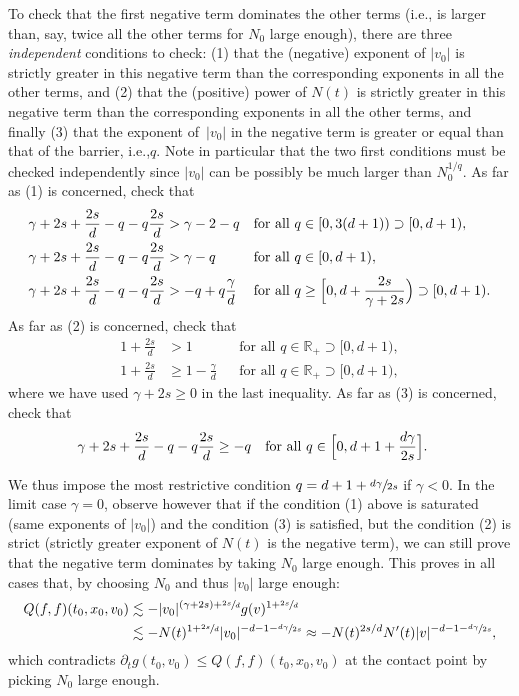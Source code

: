 \documentclass[11pt]{article}
\newcommand{\ie}{i.e.,\xspace}
\theoremstyle{plain}
\theoremstyle{definition}
\numberwithin{equation}{section}
\newcommand{\R}{\mathbb R}
\let\A N
\newcommand{\Ao}{N_0}
\begin{document}
To check that the first negative term dominates the other terms
(\ie is larger than, say, twice all the other terms for $\Ao$ large
enough), there are three \emph{independent} conditions to check: (1)
that the (negative) exponent of $|v_0|$ is strictly greater in this
negative term than the corresponding exponents in all the other terms,
and (2) that the (positive) power of $\A(t)$ is strictly greater in
this negative term than the corresponding exponents in all the other
terms, and finally (3) that the exponent of~$|v_0|$ in the negative
term is greater or equal than that of the barrier, \ie $q$. Note in
particular that the two first conditions must be checked independently since
$|v_0|$ can be possibly be much larger than $\Ao^{1/q}$. As far as (1)
is concerned, check that
\begin{align*}
\gamma + 2s + \frac{2s}{d} -q -q\frac{2s}{d}
& > \gamma - 2 - q
&& \text{for all $q \in [0,3(d+1)) \supset [0,d+1)$}, \\
\gamma + 2s + \frac{2s}{d} -q -q\frac{2s}{d}
& > \gamma - q
&& \text{for all $q \in [0,d+1)$}, \\
\gamma + 2s + \frac{2s}{d} -q -q\frac{2s}{d}
& > - q + q \frac{\gamma}{d}
&& \text{for all $q \ge \Bigl[0,d+\frac{2s}{\gamma+2s}\Bigr)
\supset [0,d+1)$}.
\end{align*}
As far as (2) is concerned, check that
\begin{align*}
1+\frac{2s}{d}
& > 1
&& \text{for all $q \in \R_+ \supset [0,d+1)$}, \\
1 + \frac{2s}{d}
& \ge 1- \frac{\gamma}{d}
&& \text{for all $q \in \R_+ \supset [0,d+1)$},
\end{align*}
where we have used $\gamma + 2s \ge 0$ in the last inequality. As far
as (3) is concerned, check that
\begin{align*}
\gamma + 2s + \frac{2s}{d} - q - q \frac{2s}{d}
& \ge -q
&& \text{for all $q \in \Bigl[0,d+1 + \frac{d\gamma}{2s}\Bigr]$.}
\end{align*}

We thus impose the most restrictive condition
$q = d+1 + \sfrac{d\gamma}{2s}$ if $\gamma <0$. In the limit case
$\gamma=0$, observe however that if the condition (1) above is
saturated (same exponents of $|v_0|$) and the condition (3) is
satisfied, but the condition (2) is strict (strictly greater exponent
of $\A(t)$ is the negative term), we can still prove that the negative
term dominates by taking $\Ao$ large enough. This proves in all cases
that, by choosing $\Ao$ and thus $|v_0|$ large enough:
\begin{align*}
Q(f,f)(t_0,x_0,v_0) &\lesssim -|v_0|^{(\gamma+2s)+\sfrac{2s}d} g(v)^{1+\sfrac{2s}d} \\
& \lesssim -\A(t)^{1+\sfrac{2s}d} |v_0|^{-d-1-\sfrac{d \gamma}{2s}} \approx -\A(t)^{2s/d} \A'(t) |v|^{-d-1-\sfrac{d\gamma}{2s}},
\end{align*}
which contradicts $\partial_t g(t_0,v_0) \le Q(f,f)(t_0,x_0,v_0)$ at
the contact point by picking $\Ao$ large enough.
\end{document}
